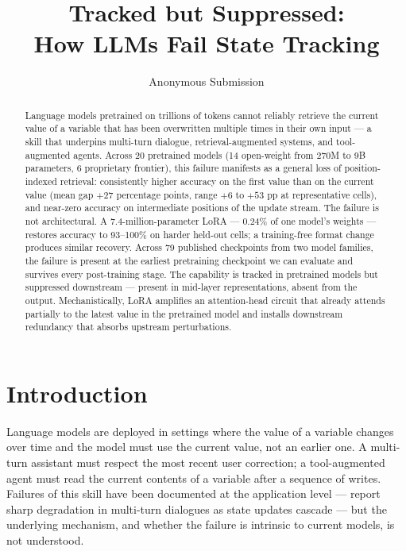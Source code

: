 \documentclass[letterpaper]{article} %
\title{Tracked but Suppressed:\\How LLMs Fail State Tracking}
\author{Anonymous Submission}
\begin{document}
\maketitle

\begin{abstract}
Language models pretrained on trillions of tokens cannot reliably
retrieve the current value of a variable that has been overwritten
multiple times in their own input --- a skill that underpins
multi-turn dialogue, retrieval-augmented systems, and tool-augmented
agents.
Across 20 pretrained models (14 open-weight from 270M to 9B
parameters, 6 proprietary frontier), this failure manifests as a
general loss of position-indexed retrieval: consistently higher
accuracy on the first value than on the current value (mean gap
$+27$ percentage points, range $+6$ to $+53$ pp at representative
cells), and
near-zero accuracy on intermediate positions of the update stream.
The failure is not architectural.
A 7.4-million-parameter LoRA --- 0.24\% of one model's weights ---
restores accuracy to 93--100\% on harder held-out cells; a
training-free format change produces similar recovery.
Across 79 published checkpoints from two model families, the failure
is present at the earliest pretraining checkpoint we can evaluate and
survives every post-training stage.
The capability is tracked in pretrained models but suppressed
downstream --- present in mid-layer representations, absent from the
output.
Mechanistically, LoRA amplifies an attention-head circuit that
already attends partially to the latest value in the pretrained
model and installs downstream redundancy that absorbs upstream
perturbations.
\end{abstract}

\section{Introduction}
\label{sec:intro}

Language models are deployed in settings where the value of a
variable changes over time and the model must use the current
value, not an earlier one.
A multi-turn assistant must respect the most recent user
correction; a tool-augmented agent must read the current contents
of a variable after a sequence of writes.
Failures of this skill have been documented at the application level
--- \citet{laban2025multiturn} report sharp degradation in
multi-turn dialogues as state updates cascade --- but the underlying
mechanism, and whether the failure is intrinsic to current models, is
not understood.
\end{document}
